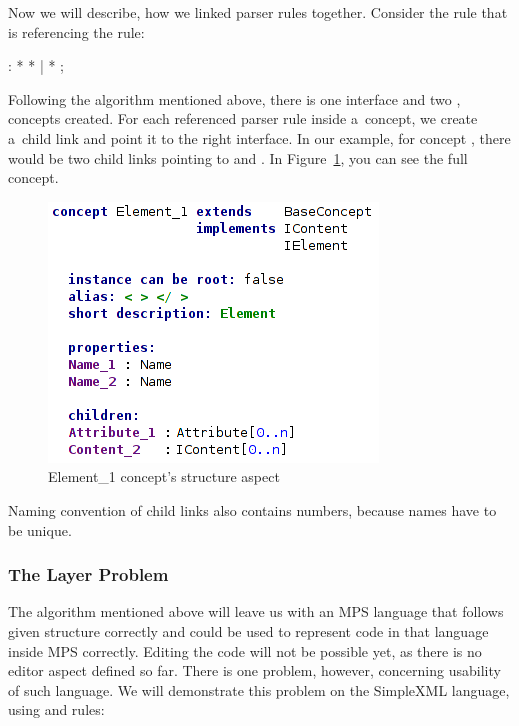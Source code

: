 Now we will describe, how we linked parser rules together.
Consider the  rule that is referencing the  rule:

\begin{antlr}
	    :   \literal{<}  * \literal{>} * \literal{</}  \literal{>}
           |   \literal{<}  * \literal{/>}
           ;
\end{antlr}

Following the algorithm mentioned above, there is one  interface and two ,  concepts created.
For each referenced parser rule inside a~concept, we create a~child link and point it to the right interface.
In our example, for concept , there would be two child links pointing to  and .
In Figure~\ref{fig:element_concept_full}, you can see the full  concept.

\begin{figure}[h]
	\centering
	\includegraphics[scale=0.75]{./img/element_concept_full.png}
	\caption{Element{\_}1 concept's structure aspect}
	\label{fig:element_concept_full}
\end{figure}

Naming convention of child links also contains numbers, because names have to be unique.

\subsubsection{The Layer Problem}
\label{chap:layer_problem}

The algorithm mentioned above will leave us with an MPS language that follows given structure correctly and could be used to represent code in that language inside MPS correctly. Editing the code will not be possible yet, as there is no editor aspect defined so far.
There is one problem, however, concerning usability of such language.
We will demonstrate this problem on the SimpleXML language, using  and  rules:

